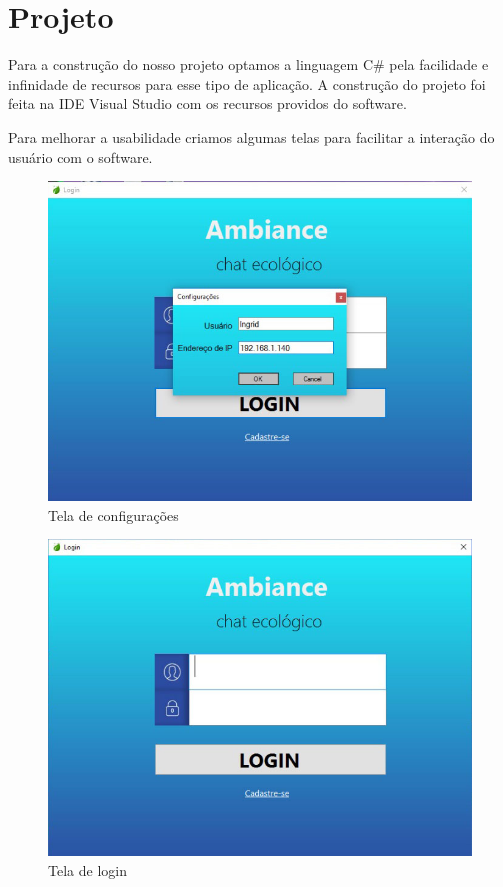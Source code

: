 \section{Projeto}
Para a construção do nosso projeto optamos a linguagem C\# pela facilidade e infinidade de recursos para esse tipo de aplicação. A construção do projeto foi feita na IDE Visual Studio com os recursos providos do software.

Para melhorar a usabilidade criamos algumas telas para facilitar a interação do usuário com o software.

\begin{figure}[!htb]
	\centering
	\includegraphics[scale=0.4]{img/t-conectar.jpeg}
	\caption{Tela de configurações}
	\label{Tela de configurações}
\end{figure}

\begin{figure}[!htb]
	\centering
	\includegraphics[scale=0.4]{img/t-login.jpeg}
	\caption{Tela de login}
	\label{Tela de login}
\end{figure}

